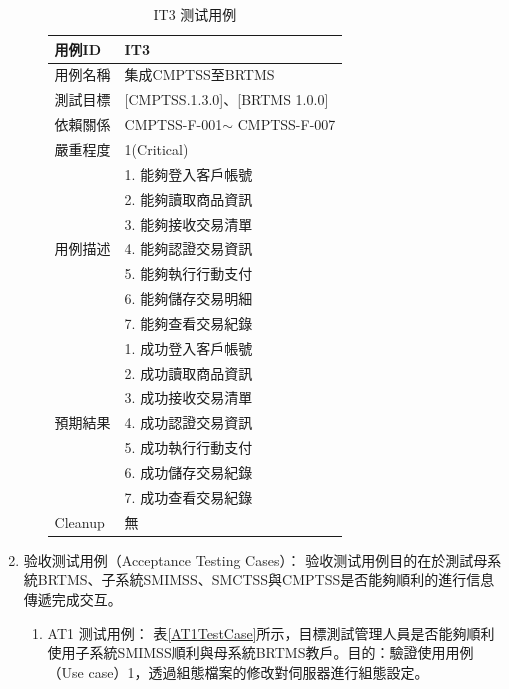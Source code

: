 \begin{enumerate}
\begin{enumerate}
						\begin{table}[htbp]
						\caption{IT3 测试用例} %
						\centering %
						\label{IT3TestCase} %
						\begin{tabular}{|l|l|}
						\hline
						用例ID & IT3 \\ \hline
						用例名稱 & 集成CMPTSS至BRTMS \\ \hline
						測試目標 & {[}CMPTSS.1.3.0{]}、{[}BRTMS 1.0.0{]} \\ \hline
						依賴關係 & CMPTSS-F-001$\sim$ CMPTSS-F-007 \\ \hline
						嚴重程度 & 1(Critical) \\ \hline
						\multirow{7}{*}{用例描述} & 1.     能夠登入客戶帳號 \\ \cline{2-2} 
						 & 2.     能夠讀取商品資訊 \\ \cline{2-2} 
						 & 3.     能夠接收交易清單 \\ \cline{2-2} 
						 & 4.     能夠認證交易資訊 \\ \cline{2-2} 
						 & 5.     能夠執行行動支付 \\ \cline{2-2} 
						 & 6.     能夠儲存交易明細 \\ \cline{2-2} 
						 & 7.     能夠查看交易紀錄 \\ \hline
						\multirow{7}{*}{預期結果} & 1.     成功登入客戶帳號 \\ \cline{2-2} 
						 & 2.     成功讀取商品資訊 \\ \cline{2-2} 
						 & 3.     成功接收交易清單 \\ \cline{2-2} 
						 & 4.     成功認證交易資訊 \\ \cline{2-2} 
						 & 5.     成功執行行動支付 \\ \cline{2-2} 
						 & 6.     成功儲存交易紀錄 \\ \cline{2-2} 
						 & 7.     成功查看交易紀錄 \\ \hline
						Cleanup & 無 \\ \hline
						\end{tabular}
						\end{table}
				\end{enumerate}

		\item 验收测试用例（Acceptance Testing Cases）：
			验收测试用例目的在於測試母系統BRTMS、子系統SMIMSS、SMCTSS與CMPTSS是否能夠順利的進行信息傳遞完成交互。

			\begin{enumerate}
				\item AT1 测试用例：
					表\ref{AT1TestCase}所示，目標測試管理人員是否能夠順利使用子系統SMIMSS順利與母系統BRTMS教戶。目的：驗證使用用例（Use case）1，透過組態檔案的修改對伺服器進行組態設定。


\end{enumerate}
\end{enumerate}
